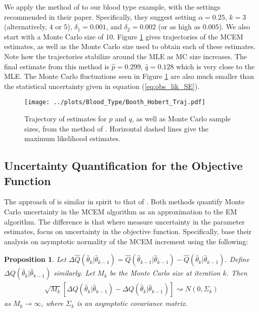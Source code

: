 \documentclass[11pt, oneside]{article}   	%
\newtheorem{proposition}{Proposition}[section]
\begin{document}
We apply the method of \citeauthor{Boo99} to our blood type example, with the settings recommended in their paper. Specifically, they suggest setting $\alpha = 0.25$, $k = 3$ (alternatively, $4$ or $5$), $\delta_1 = 0.001$, and $\delta_2 = 0.002$ (or as high as $0.005$). We also start with a Monte Carlo size of 10. Figure \ref{fig:blood_BH_traj} gives trajectories of the MCEM estimates, as well as the Monte Carlo size used to obtain each of these estimates. Note how the trajectories stabilize around the MLE as MC size increases. The final estimate from this method is $\hat{p} = 0.299$, $\hat{q} = 0.128$ which is very close to the MLE. The Monte Carlo fluctuations seen in Figure \ref{fig:blood_BH_traj} are also much smaller than the statistical uncertainty given in equation (\ref{eq:obs_lik_SE}).



\begin{figure}
    \centering
    \caption{Trajectory of estimates for $p$ and $q$, as well as Monte Carlo sample sizes, from the method of \citeauthor{Boo99}. Horizontal dashed lines give the maximum likelihood estimates.}
    \label{fig:blood_BH_traj}
    \texttt{[image: ../plots/Blood\_Type/Booth\_Hobert\_Traj.pdf]}   
\end{figure}









\subsection{Uncertainty Quantification for the Objective Function \citep{Caf05}}
\label{sec:AMCEM}

The approach of \citet{Caf05} is similar in spirit to that of \citet{Boo99}. Both methods quantify Monte Carlo uncertainty in the MCEM algorithm as an approximation to the EM algorithm. The difference is that where \citeauthor{Boo99} measure uncertainty in the parameter estimates, \citeauthor{Caf05} focus on uncertainty in the objective function. Specifically, \citeauthor{Caf05} base their analysis on asymptotic normality of the MCEM increment using the following:
%
\begin{proposition}
    \label{thm2:Caf_normality}
    Let $\Delta \hat{Q}(\hat{\theta}_k|\hat{\theta}_{k-1}) = \hat{Q}(\hat{\theta}_{k-1}|\hat{\theta}_{k-1}) - \hat{Q}(\hat{\theta}_k|\hat{\theta}_{k-1})$. Define $\Delta Q(\hat{\theta}_k|\hat{\theta}_{k-1})$ similarly. Let $M_k$ be the Monte Carlo size at iteration $k$. Then
    \begin{align}
        \sqrt{M_k} \left[ \Delta \hat{Q}(\hat{\theta}_k|\hat{\theta}_{k-1}) - \Delta Q(\hat{\theta}_k|\hat{\theta}_{k-1}) \right] \rightsquigarrow N(0, \Sigma_k)
    \end{align}
    as $M_k \rightarrow \infty$, where $\Sigma_k$ is an asymptotic covariance matrix.
\end{proposition}
\end{document}
